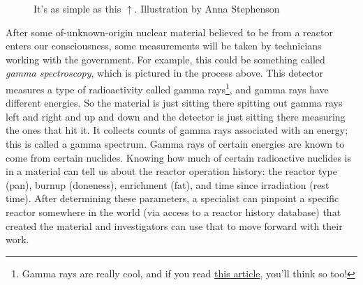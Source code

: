 {\begin{figure}[H]
  \centering
  \large It's as simple as this $\uparrow$. \small Illustration by Anna Stephenson
\end{figure}

After some of-unknown-origin nuclear material believed to be from a reactor
enters our consciousness, some measurements will be taken by technicians
working with the government. For example, this could be something called
\textit{gamma spectroscopy}, which is pictured in the process above. This
detector measures a type of radioactivity called gamma rays\footnote{Gamma rays
are really cool, and if you read
\href{https://www.symmetrymagazine.org/article/incredible-hulking-facts-about-gamma-rays}{\color{blue}this
article}, you'll think so too!}, and gamma rays have different energies. So the
material is just sitting there spitting out gamma rays left and right and up
and down and the detector is just sitting there measuring the ones that hit it.
It collects counts of gamma rays associated with an energy; this is called a
gamma spectrum. Gamma rays of certain energies are known to come from certain
nuclides. Knowing how much of certain radioactive nuclides is in a material can
tell us about the reactor operation history: the reactor type (pan), burnup
(doneness), enrichment (fat), and time since irradiation (rest time). After
determining these parameters, a specialist can pinpoint a specific reactor
somewhere in the world (via access to a reactor history database) that created
the material and investigators can use that to move forward with their work.

}
